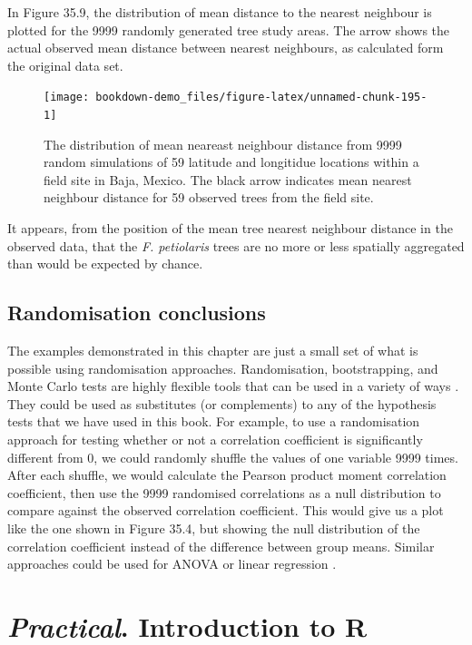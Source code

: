 \documentclass[
]{scrbook}
\begin{document}
In Figure 35.9, the distribution of mean distance to the nearest neighbour is plotted for the 9999 randomly generated tree study areas.
The arrow shows the actual observed mean distance between nearest neighbours, as calculated form the original data set.

\begin{figure}
\texttt{[image: bookdown-demo\_files/figure-latex/unnamed-chunk-195-1]} \caption{The distribution of mean neareast neighbour distance from 9999 random simulations of 59 latitude and longitidue locations within a field site in Baja, Mexico. The black arrow indicates mean nearest neighbour distance for 59 observed trees from the field site.}\label{fig:unnamed-chunk-195}
\end{figure}

It appears, from the position of the mean tree nearest neighbour distance in the observed data, that the \emph{F. petiolaris} trees are no more or less spatially aggregated than would be expected by chance.

\hypertarget{randomisation-conclusions}{%
\section{Randomisation conclusions}\label{randomisation-conclusions}}

The examples demonstrated in this chapter are just a small set of what is possible using randomisation approaches.
Randomisation, bootstrapping, and Monte Carlo tests are highly flexible tools that can be used in a variety of ways \citep{Manly2007}.
They could be used as substitutes (or complements) to any of the hypothesis tests that we have used in this book.
For example, to use a randomisation approach for testing whether or not a correlation coefficient is significantly different from 0, we could randomly shuffle the values of one variable 9999 times.
After each shuffle, we would calculate the Pearson product moment correlation coefficient, then use the 9999 randomised correlations as a null distribution to compare against the observed correlation coefficient.
This would give us a plot like the one shown in Figure 35.4, but showing the null distribution of the correlation coefficient instead of the difference between group means.
Similar approaches could be used for ANOVA or linear regression \citep{Manly2007}.

\hypertarget{Chapter_36}{%
\chapter{\texorpdfstring{\emph{Practical}. Introduction to R}{Practical. Introduction to R}}\label{Chapter_36}}
\end{document}
